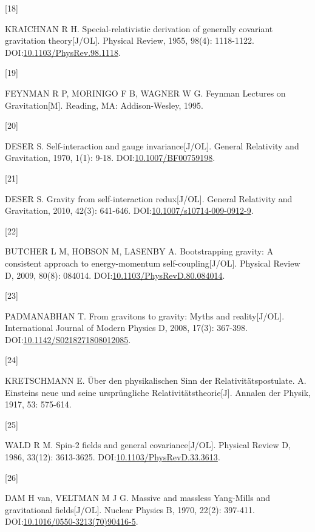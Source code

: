 \documentclass[
  chinese,
  a4paper,
  UTF8,
  12pt,
  oneside,
  openany]{ctexbook}
\newlength{\cslhangindent}
\newlength{\csllabelwidth}
\newenvironment{CSLReferences}[2] %
 {\begin{list}{}{%
  \setlength{\itemindent}{0pt}
  \setlength{\leftmargin}{0pt}
  \setlength{\parsep}{0pt}
  \ifodd #1
   \setlength{\leftmargin}{\cslhangindent}
   \setlength{\itemindent}{-1\cslhangindent}
  \fi
  \setlength{\itemsep}{#2\baselineskip}}}
 {\end{list}}
\newcommand{\CSLLeftMargin}[1]{\parbox[t]{\csllabelwidth}{\strut#1\strut}}
\newcommand{\CSLRightInline}[1]{\parbox[t]{\linewidth - \csllabelwidth}{\strut#1\strut}}
\theoremstyle{plain}
\theoremstyle{plain}
\theoremstyle{plain}
\theoremstyle{definition}
\theoremstyle{plain}
\theoremstyle{plain}
\theoremstyle{remark}
\begin{document}
\begin{CSLReferences}{0}{0}
\CSLLeftMargin{{[}18{]} }%
\CSLRightInline{KRAICHNAN R H. Special-relativistic derivation of
generally covariant gravitation theory{[}J/OL{]}. Physical Review, 1955,
98(4): 1118-1122.
DOI:\href{https://doi.org/10.1103/PhysRev.98.1118}{10.1103/PhysRev.98.1118}.}

\CSLLeftMargin{{[}19{]} }%
\CSLRightInline{FEYNMAN R P, MORINIGO F B, WAGNER W G. Feynman Lectures
on Gravitation{[}M{]}. Reading, MA: Addison-Wesley, 1995.}

\CSLLeftMargin{{[}20{]} }%
\CSLRightInline{DESER S. Self-interaction and gauge
invariance{[}J/OL{]}. General Relativity and Gravitation, 1970, 1(1):
9-18.
DOI:\href{https://doi.org/10.1007/BF00759198}{10.1007/BF00759198}.}

\CSLLeftMargin{{[}21{]} }%
\CSLRightInline{DESER S. Gravity from self-interaction redux{[}J/OL{]}.
General Relativity and Gravitation, 2010, 42(3): 641-646.
DOI:\href{https://doi.org/10.1007/s10714-009-0912-9}{10.1007/s10714-009-0912-9}.}

\CSLLeftMargin{{[}22{]} }%
\CSLRightInline{BUTCHER L M, HOBSON M, LASENBY A. Bootstrapping gravity:
A consistent approach to energy-momentum self-coupling{[}J/OL{]}.
Physical Review D, 2009, 80(8): 084014.
DOI:\href{https://doi.org/10.1103/PhysRevD.80.084014}{10.1103/PhysRevD.80.084014}.}

\CSLLeftMargin{{[}23{]} }%
\CSLRightInline{PADMANABHAN T. From gravitons to gravity: Myths and
reality{[}J/OL{]}. International Journal of Modern Physics D, 2008,
17(3): 367-398.
DOI:\href{https://doi.org/10.1142/S0218271808012085}{10.1142/S0218271808012085}.}

\CSLLeftMargin{{[}24{]} }%
\CSLRightInline{KRETSCHMANN E. {Ü}ber den physikalischen Sinn der
Relativit{ä}tspostulate. A. Einsteins neue und seine urspr{ü}ngliche
Relativit{ä}tstheorie{[}J{]}. Annalen der Physik, 1917, 53: 575-614.}

\CSLLeftMargin{{[}25{]} }%
\CSLRightInline{WALD R M. Spin-2 fields and general
covariance{[}J/OL{]}. Physical Review D, 1986, 33(12): 3613-3625.
DOI:\href{https://doi.org/10.1103/PhysRevD.33.3613}{10.1103/PhysRevD.33.3613}.}

\CSLLeftMargin{{[}26{]} }%
\CSLRightInline{DAM H van, VELTMAN M J G. Massive and massless
Yang-Mills and gravitational fields{[}J/OL{]}. Nuclear Physics B, 1970,
22(2): 397-411.
DOI:\href{https://doi.org/10.1016/0550-3213(70)90416-5}{10.1016/0550-3213(70)90416-5}.}


\end{CSLReferences}
\end{document}

